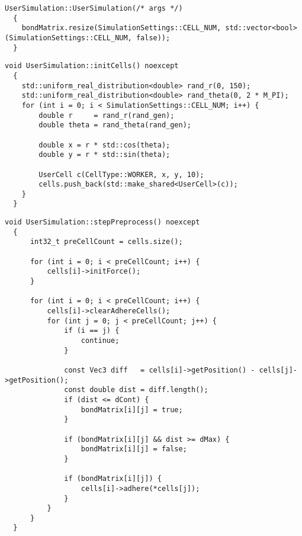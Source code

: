 \documentclass[vipdfmx,a4paper,11pt]{jsarticle}
\begin{document}
\begin{lstlisting}[caption=UserSimulation()]
  UserSimulation::UserSimulation(/* args */)
  {
    bondMatrix.resize(SimulationSettings::CELL_NUM, std::vector<bool>(SimulationSettings::CELL_NUM, false));
  }
\end{lstlisting}

\begin{lstlisting}[caption=initCells()]
  void UserSimulation::initCells() noexcept
  {
    std::uniform_real_distribution<double> rand_r(0, 150);
    std::uniform_real_distribution<double> rand_theta(0, 2 * M_PI);
    for (int i = 0; i < SimulationSettings::CELL_NUM; i++) {
        double r     = rand_r(rand_gen);
        double theta = rand_theta(rand_gen);

        double x = r * std::cos(theta);
        double y = r * std::sin(theta);

        UserCell c(CellType::WORKER, x, y, 10);
        cells.push_back(std::make_shared<UserCell>(c));
    }
  }
\end{lstlisting}

\begin{lstlisting}[caption=stepPreprocess()]
  void UserSimulation::stepPreprocess() noexcept
  {
      int32_t preCellCount = cells.size();
  
      for (int i = 0; i < preCellCount; i++) {
          cells[i]->initForce();
      }
  
      for (int i = 0; i < preCellCount; i++) {
          cells[i]->clearAdhereCells();
          for (int j = 0; j < preCellCount; j++) {
              if (i == j) {
                  continue;
              }
  
              const Vec3 diff   = cells[i]->getPosition() - cells[j]->getPosition();
              const double dist = diff.length();
              if (dist <= dCont) {
                  bondMatrix[i][j] = true;
              }
  
              if (bondMatrix[i][j] && dist >= dMax) {
                  bondMatrix[i][j] = false;
              }
  
              if (bondMatrix[i][j]) {
                  cells[i]->adhere(*cells[j]);
              }
          }
      }
  }
\end{lstlisting}
\end{document}
